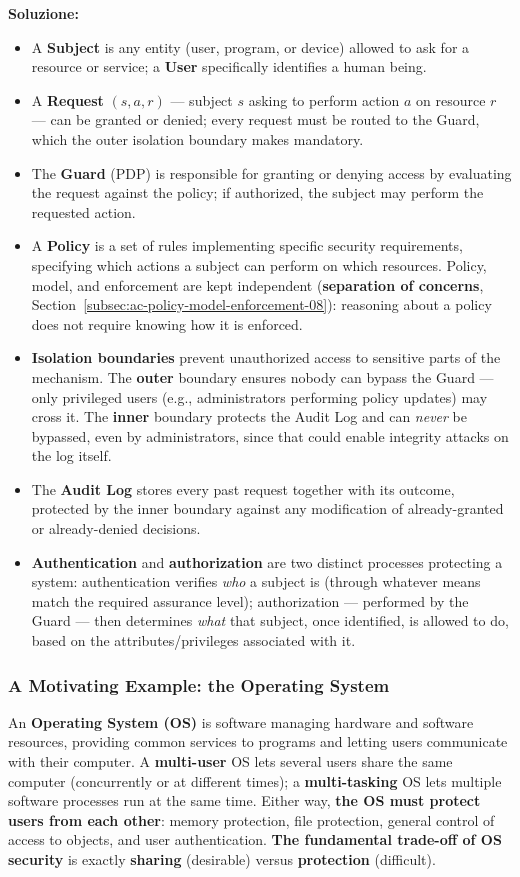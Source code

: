 \documentclass[12pt, a4paper]{article}
\begin{document}
\textbf{Soluzione:}
\begin{itemize}
    \item[(a)] A \textbf{Subject} is any entity (user, program, or device) allowed to ask for a resource or service; a \textbf{User} specifically identifies a human being.
    \item[(b)] A \textbf{Request} $(s,a,r)$ --- subject $s$ asking to perform action $a$ on resource $r$ --- can be granted or denied; every request must be routed to the Guard, which the outer isolation boundary makes mandatory.
    \item[(c)] The \textbf{Guard} (PDP) is responsible for granting or denying access by evaluating the request against the policy; if authorized, the subject may perform the requested action.
    \item[(d)] A \textbf{Policy} is a set of rules implementing specific security requirements, specifying which actions a subject can perform on which resources. Policy, model, and enforcement are kept independent (\textbf{separation of concerns}, Section~\ref{subsec:ac-policy-model-enforcement-08}): reasoning about a policy does not require knowing how it is enforced.
    \item[(e)] \textbf{Isolation boundaries} prevent unauthorized access to sensitive parts of the mechanism. The \textbf{outer} boundary ensures nobody can bypass the Guard --- only privileged users (e.g., administrators performing policy updates) may cross it. The \textbf{inner} boundary protects the Audit Log and can \emph{never} be bypassed, even by administrators, since that could enable integrity attacks on the log itself.
    \item[(f)] The \textbf{Audit Log} stores every past request together with its outcome, protected by the inner boundary against any modification of already-granted or already-denied decisions.
    \item[(g)] \textbf{Authentication} and \textbf{authorization} are two distinct processes protecting a system: authentication verifies \emph{who} a subject is (through whatever means match the required assurance level); authorization --- performed by the Guard --- then determines \emph{what} that subject, once identified, is allowed to do, based on the attributes/privileges associated with it.
\end{itemize}

\subsubsection{A Motivating Example: the Operating System}
An \textbf{Operating System (OS)} is software managing hardware and software resources, providing common services to programs and letting users communicate with their computer. A \textbf{multi-user} OS lets several users share the same computer (concurrently or at different times); a \textbf{multi-tasking} OS lets multiple software processes run at the same time. Either way, \textcolor{red!70!black}{\textbf{the OS must protect users from each other}}: memory protection, file protection, general control of access to objects, and user authentication. \textbf{The fundamental trade-off of OS security} is exactly \textbf{sharing} (desirable) versus \textbf{protection} (difficult).
\end{document}
